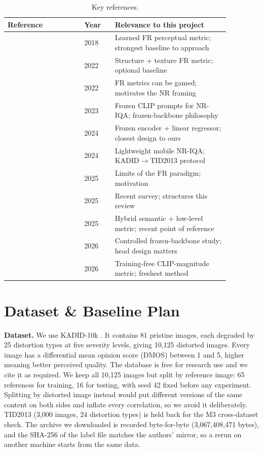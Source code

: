 \documentclass[11pt]{article}
\begin{document}
\begin{table}[h]
\centering
\caption{Key references.}
\label{tab:refs}
\begin{tabular}{@{}p{0.30\linewidth}p{0.12\linewidth}p{0.45\linewidth}@{}}
\toprule
\textbf{Reference} & \textbf{Year} & \textbf{Relevance to this project} \\
\midrule
\citep{zhang2018lpips} & 2018 & Learned FR perceptual metric; strongest baseline to approach \\
\citep{ding2022dists}  & 2022 & Structure + texture FR metric; optional baseline \\
\citep{siniukov2022limitations} & 2022 & FR metrics can be gamed; motivates the NR framing \\
\citep{wang2023clipiqa} & 2023 & Frozen CLIP prompts for NR-IQA; frozen-backbone philosophy \\
\citep{agnolucci2024arniqa} & 2024 & Frozen encoder + linear regressor; closest design to ours \\
\citep{jamshidi2024lariqa} & 2024 & Lightweight mobile NR-IQA; KADID$\rightarrow$TID2013 protocol \\
\citep{chen2025afine} & 2025 & Limits of the FR paradigm; motivation \\
\citep{ma2025survey} & 2025 & Recent survey; structures this review \\
\citep{lao2025spips} & 2025 & Hybrid semantic + low-level metric; recent point of reference \\
\citep{yadav2026vlfoundations} & 2026 & Controlled frozen-backbone study; head design matters \\
\citep{liao2026maclip} & 2026 & Training-free CLIP-magnitude metric; freshest method \\
\bottomrule
\end{tabular}
\end{table}

\section{Dataset \& Baseline Plan}
\label{sec:data}
\textbf{Dataset.} We use KADID-10k \citep{lin2019kadid}. It contains 81 pristine images,
each degraded by 25 distortion types at five severity levels, giving 10,125 distorted
images. Every image has a differential mean opinion score (DMOS) between 1 and 5, higher
meaning better perceived quality. The database is free for research use and we cite it as
required. We keep all 10,125 images but split by reference image: 65 references for
training, 16 for testing, with seed 42 fixed before any experiment. Splitting by distorted
image instead would put different versions of the same content on both sides and inflate
every correlation, so we avoid it deliberately. TID2013 (3,000 images, 24 distortion types)
is held back for the M3 cross-dataset check. The archive we downloaded is recorded
byte-for-byte (3,067,408,471 bytes), and the SHA-256 of the label file matches the authors'
mirror, so a rerun on another machine starts from the same data.
\end{document}
